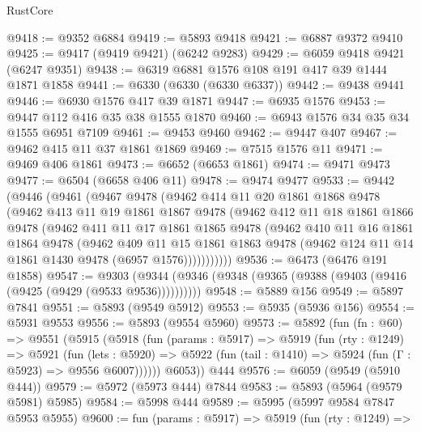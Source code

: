 \begin{lexlean}{RustCore}
\begin{coremodule}
@9418 := @9352 @6884
@9419 := @5893 @9418
@9421 := @6887 @9372 @9410
@9425 := @9417 (@9419 @9421) (@6242 @9283)
@9429 := @6059 @9418 @9421 (@6247 @9351)
@9438 := @6319 @6881 @1576 @108 @191 @417 @39 @1444 @1871 @1858
@9441 := @6330 (@6330 (@6330 @6337))
@9442 := @9438 @9441
@9446 := @6930 @1576 @417 @39 @1871
@9447 := @6935 @1576
@9453 := @9447 @112 @416 @35 @38 @1555 @1870
@9460 := @6943 @1576 @34 @35 @34 @1555 @6951 @7109
@9461 := @9453 @9460
@9462 := @9447 @407
@9467 := @9462 @415 @11 @37 @1861 @1869
@9469 := @7515 @1576 @11
@9471 := @9469 @406 @1861
@9473 := @6652 (@6653 @1861)
@9474 := @9471 @9473
@9477 := @6504 (@6658 @406 @11)
@9478 := @9474 @9477
@9533 := @9442
    (@9446
      (@9461
        (@9467
          @9478
          (@9462
            @414
            @11
            @20
            @1861
            @1868
            @9478
            (@9462
              @413
              @11
              @19
              @1861
              @1867
              @9478
              (@9462
                @412
                @11
                @18
                @1861
                @1866
                @9478
                (@9462
                  @411
                  @11
                  @17
                  @1861
                  @1865
                  @9478
                  (@9462
                    @410
                    @11
                    @16
                    @1861
                    @1864
                    @9478
                    (@9462
                      @409
                      @11
                      @15
                      @1861
                      @1863
                      @9478
                      (@9462 @124 @11 @14 @1861 @1430 @9478 (@6957 @1576)))))))))))
@9536 := @6473 (@6476 @191 @1858)
@9547 := @9303 (@9344 (@9346 (@9348 (@9365 (@9388 (@9403 (@9416 (@9425 (@9429 (@9533 @9536))))))))))
@9548 := @5889 @156
@9549 := @5897 @7841
@9551 := @5893 (@9549 @5912)
@9553 := @5935 (@5936 @156)
@9554 := @5931 @9553
@9556 := @5893 (@9554 @5960)
@9573 := @5892
    (fun (fn : @60) =>
    @9551
      (@5915
        (@5918
          (fun (params : @5917) =>
          @5919
            (fun (rty : @1249) =>
            @5921
              (fun (lets : @5920) =>
              @5922 (fun (tail : @1410) => @5924 (fun (Γ : @5923) => @9556 @6007))))))
        @6053))
    @444
@9576 := @6059 (@9549 (@5910 @444))
@9579 := @5972 (@5973 @444) @7844
@9583 := @5893 (@5964 (@9579 @5981) @5985)
@9584 := @5998 @444
@9589 := @5995 (@5997 @9584 @7847 @5953 @5955)
@9600 := fun (params : @5917) =>
  @5919
    (fun (rty : @1249) =>

\end{coremodule}
\end{lexlean}
